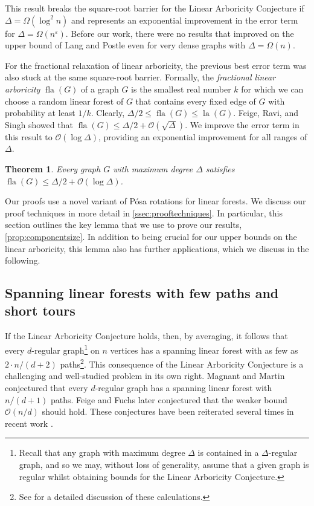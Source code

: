 \documentclass[11pt]{article}
\theoremstyle{plain}
\newtheorem{theorem}{Theorem}[section]
\theoremstyle{definition}
\newcommand{\eps}{\varepsilon}
\newcommand{\cO}{\mathcal O}
\DeclareMathOperator{\la}{la}
\DeclareMathOperator{\fla}{fla}
\begin{document}
This result breaks the square-root barrier for the Linear Arboricity Conjecture if $\Delta = \Omega(\log^2 n)$ and represents an exponential improvement in the error term for $\Delta = \Omega(n^\eps)$. Before our work, there were no results that improved on the upper bound of Lang and Postle \cite{lang2023improved} even for very dense graphs with $\Delta = \Omega(n)$.

For the fractional relaxation of linear arboricity, the previous best error term was also stuck at the same square-root barrier. Formally, the \emph{fractional linear arboricity} $\fla(G)$ of a graph $G$ is the smallest real number $k$ for which we can choose a random linear forest of $G$ that contains every fixed edge of $G$ with probability at least $1/k$. Clearly, $\Delta/2 \le \fla(G) \le \la(G)$. Feige, Ravi, and Singh \cite{feige2014short} showed that $\fla(G) \le \Delta/2 + \cO(\sqrt{\Delta})$. We improve the error term in this result to $\cO(\log \Delta)$, providing an exponential improvement for all ranges of $\Delta$.

\begin{theorem}\label{thm:fractionallineararboricitylogerror}
    Every graph $G$ with maximum degree $\Delta$ satisfies $\fla(G) \le \Delta / 2 + \cO(\log \Delta)$.
\end{theorem}

Our proofs use a novel variant of P\'{o}sa rotations for linear forests. We discuss our proof techniques in more detail in \cref{ssec:prooftechniques}. In particular, this section outlines the key lemma that we use to prove our results, \cref{prop:componentsize}. In addition to being crucial for our upper bounds on the linear arboricity, this lemma also has further applications, which we discuss in the following.

\subsection{Spanning linear forests with few paths and short tours}\label{ssec:linearforeststours}

If the Linear Arboricity Conjecture holds, then, by averaging, it follows that every $d$-regular graph\footnote{Recall that any graph with maximum degree $\Delta$ is contained in a $\Delta$-regular graph, and so we may, without loss of generality, assume that a given graph is regular whilst obtaining bounds for the Linear Arboricity Conjecture.} on $n$ vertices has a spanning linear forest with as few as $2 \cdot n/(d+2)$ paths\footnote{See \cite[Section 1.1]{feige2022path} for a detailed discussion of these calculations.}. This consequence of the Linear Arboricity Conjecture is a challenging and well-studied problem in its own right. Magnant and Martin \cite{magnant2009note} conjectured that every $d$-regular graph has a spanning linear forest with $n/(d+1)$ paths. Feige and Fuchs later conjectured that the weaker bound $\cO(n/d)$ should hold. These conjectures have been reiterated several times in recent work \cite{montgomery2024approximate, letzter2025nearly}.
\end{document}
